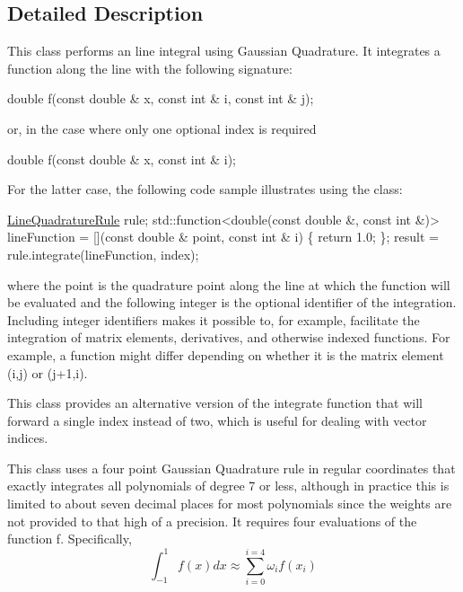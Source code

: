 \subsection{Detailed Description}
This class performs an line integral using Gaussian Quadrature. It integrates a function along the line with the following signature\+: 
\begin{DoxyCode}
\textcolor{keywordtype}{double} f(\textcolor{keyword}{const} \textcolor{keywordtype}{double} & x, \textcolor{keyword}{const} \textcolor{keywordtype}{int} & i, \textcolor{keyword}{const} \textcolor{keywordtype}{int} & j);
\end{DoxyCode}
 or, in the case where only one optional index is required 
\begin{DoxyCode}
\textcolor{keywordtype}{double} f(\textcolor{keyword}{const} \textcolor{keywordtype}{double} & x, \textcolor{keyword}{const} \textcolor{keywordtype}{int} & i);
\end{DoxyCode}
 For the latter case, the following code sample illustrates using the class\+: 
\begin{DoxyCode}
\hyperlink{a00865_ab811321337291e043129e0ec7d90f876}{LineQuadratureRule} rule;
std::function<double(\textcolor{keyword}{const} \textcolor{keywordtype}{double} &,
   \textcolor{keyword}{const} \textcolor{keywordtype}{int} &)> lineFunction = [](\textcolor{keyword}{const} \textcolor{keywordtype}{double} & point,
   \textcolor{keyword}{const} \textcolor{keywordtype}{int} & i) \{
   \textcolor{keywordflow}{return} 1.0;
\};
result = rule.integrate(lineFunction, index);
\end{DoxyCode}
 where the point is the quadrature point along the line at which the function will be evaluated and the following integer is the optional identifier of the integration. Including integer identifiers makes it possible to, for example, facilitate the integration of matrix elements, derivatives, and otherwise indexed functions. For example, a function might differ depending on whether it is the matrix element (i,j) or (j+1,i).

This class provides an alternative version of the integrate function that will forward a single index instead of two, which is useful for dealing with vector indices.

This class uses a four point Gaussian Quadrature rule in regular coordinates that exactly integrates all polynomials of degree 7 or less, although in practice this is limited to about seven decimal places for most polynomials since the weights are not provided to that high of a precision. It requires four evaluations of the function f. Specifically, \[ \int_{-1}^{1} f(x) dx \approx \sum_{i=0}^{i=4} \omega_{i}f(x_{i}) \]

